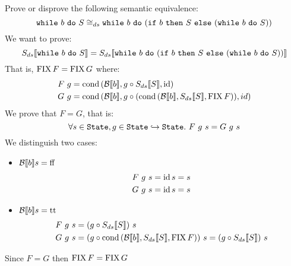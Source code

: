 \begin{exercise}{
    Prove or disprove the following semantic equivalence:
    \[ \wwhile{b}{S} \DScong \wwhile{b}{(\wif{b}{S}{(\wwhile{b}{S})})} \]
}
    We want to prove:
    \[ \Sds{\wwhile{b}{S}} = \Sds{\wwhile{b}{(\wif{b}{S}{(\wwhile{b}{S})})}} \]
    That is, $\FIX F = \FIX G$ where:
    \begin{align*}
        F\ g &= \cond{\Bool{b}}{g \circ \Sds{S}}{\id} \\
        G\ g &= \cond{\Bool{b}}{g \circ (\cond{\Bool{b}}{\Sds{S}}{\FIX F})}{id}
    \end{align*}
    We prove that $F = G$, that is:
    \[ \forall s \in \State, g \in \State \hookrightarrow \State.\ F\ g\ s = G\ g\ s \]
    We distinguish two cases:
    \begin{itemize}
        \item $\Bool{b} s = \False$
            \begin{align*}
                F\ g \ s = \id s = s \\
                G\ g \ s = \id s = s
            \end{align*}
        \item $\Bool{b} s = \True$
            \begin{align*}
                F\ g\ s &= (g \circ \Sds{S})\ s \\
                G\ g\ s &= (g \circ \cond{\Bool{b}}{\Sds{S}}{\FIX F})\ s = (g \circ \Sds{S})\ s
            \end{align*}
    \end{itemize}
    Since $F = G$ then $\FIX F = \FIX G$
\end{exercise}
